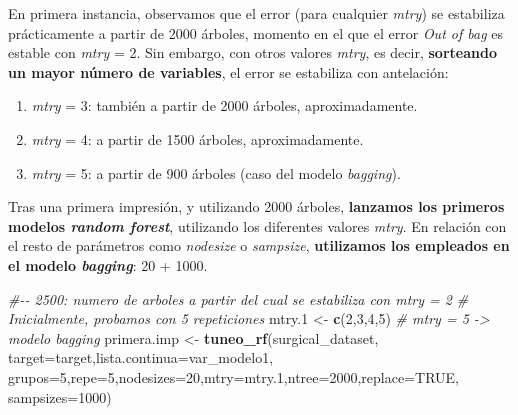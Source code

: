 \documentclass[
]{article}
\newenvironment{Shaded}{\begin{snugshade}}{\end{snugshade}}
\newcommand{\CommentTok}[1]{\textcolor[rgb]{0.56,0.35,0.01}{\textit{#1}}}
\newcommand{\DataTypeTok}[1]{\textcolor[rgb]{0.13,0.29,0.53}{#1}}
\newcommand{\DecValTok}[1]{\textcolor[rgb]{0.00,0.00,0.81}{#1}}
\newcommand{\FloatTok}[1]{\textcolor[rgb]{0.00,0.00,0.81}{#1}}
\newcommand{\KeywordTok}[1]{\textcolor[rgb]{0.13,0.29,0.53}{\textbf{#1}}}
\newcommand{\NormalTok}[1]{#1}
\newcommand{\OtherTok}[1]{\textcolor[rgb]{0.56,0.35,0.01}{#1}}
\newcommand{\StringTok}[1]{\textcolor[rgb]{0.31,0.60,0.02}{#1}}
\providecommand{\tightlist}{%
  \setlength{\itemsep}{0pt}\setlength{\parskip}{0pt}}
\begin{document}
En primera instancia, observamos que el error (para cualquier
\emph{mtry}) se estabiliza prácticamente a partir de 2000 árboles,
momento en el que el error \emph{Out of bag} es estable con \emph{mtry}
= 2. Sin embargo, con otros valores \emph{mtry}, es decir,
\textbf{sorteando un mayor número de variables}, el error se estabiliza
con antelación:

\begin{enumerate}
\def\labelenumi{\arabic{enumi}.}
\tightlist
\item
  \emph{mtry} = 3: también a partir de 2000 árboles, aproximadamente.
\item
  \emph{mtry} = 4: a partir de 1500 árboles, aproximadamente.
\item
  \emph{mtry} = 5: a partir de 900 árboles (caso del modelo
  \emph{bagging}).
\end{enumerate}

Tras una primera impresión, y utilizando 2000 árboles, \textbf{lanzamos
los primeros modelos \emph{random forest}}, utilizando los diferentes
valores \emph{mtry}. En relación con el resto de parámetros como
\emph{nodesize} o \emph{sampsize}, \textbf{utilizamos los empleados en
el modelo \emph{bagging}}: 20 + 1000.

\begin{Shaded}
\begin{Highlighting}[]
\CommentTok{\#{-}{-} 2500: numero de arboles a partir del cual se estabiliza con mtry = 2}
\CommentTok{\#   Inicialmente, probamos con 5 repeticiones}
\NormalTok{mtry}\FloatTok{.1}\NormalTok{ <{-}}\StringTok{ }\KeywordTok{c}\NormalTok{(}\DecValTok{2}\NormalTok{,}\DecValTok{3}\NormalTok{,}\DecValTok{4}\NormalTok{,}\DecValTok{5}\NormalTok{) }\CommentTok{\# mtry = 5 {-}> modelo bagging}
\NormalTok{primera.imp <{-}}\StringTok{ }\KeywordTok{tuneo\_rf}\NormalTok{(surgical\_dataset, }\DataTypeTok{target=}\NormalTok{target,}\DataTypeTok{lista.continua=}\NormalTok{var\_modelo1,}
                        \DataTypeTok{grupos=}\DecValTok{5}\NormalTok{,}\DataTypeTok{repe=}\DecValTok{5}\NormalTok{,}\DataTypeTok{nodesizes=}\DecValTok{20}\NormalTok{,}\DataTypeTok{mtry=}\NormalTok{mtry}\FloatTok{.1}\NormalTok{,}\DataTypeTok{ntree=}\DecValTok{2000}\NormalTok{,}\DataTypeTok{replace=}\OtherTok{TRUE}\NormalTok{, }
                        \DataTypeTok{sampsizes=}\DecValTok{1000}\NormalTok{)}
\end{Highlighting}
\end{Shaded}
\end{document}
